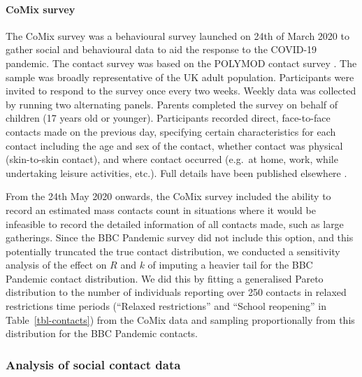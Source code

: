 \documentclass[
  10pt,
  letterpaper,
]{article}
\begin{document}
\paragraph{CoMix survey}\label{comix-survey}

The CoMix survey was a behavioural survey launched on 24th of March 2020
to gather social and behavioural data to aid the response to the
COVID-19 pandemic. The contact survey was based on the POLYMOD contact
survey \citep{mossong2008}. The sample was broadly representative of the
UK adult population. Participants were invited to respond to the survey
once every two weeks. Weekly data was collected by running two
alternating panels. Parents completed the survey on behalf of children
(17 years old or younger). Participants recorded direct, face-to-face
contacts made on the previous day, specifying certain characteristics
for each contact including the age and sex of the contact, whether
contact was physical (skin-to-skin contact), and where contact occurred
(e.g.~at home, work, while undertaking leisure activities, etc.). Full
details have been published elsewhere \citep{gimma2022}.

From the 24th May 2020 onwards, the CoMix survey included the ability to
record an estimated mass contacts count in situations where it would be
infeasible to record the detailed information of all contacts made, such
as large gatherings. Since the BBC Pandemic survey did not include this
option, and this potentially truncated the true contact distribution, we
conducted a sensitivity analysis of the effect on \(R\) and \(k\) of
imputing a heavier tail for the BBC Pandemic contact distribution. We
did this by fitting a generalised Pareto distribution to the number of
individuals reporting over 250 contacts in relaxed restrictions time
periods (``Relaxed restrictions'' and ``School reopening'' in
Table~\ref{tbl-contacts}) from the CoMix data and sampling
proportionally from this distribution for the BBC Pandemic contacts.

\subsubsection{Analysis of social contact
data}\label{analysis-of-social-contact-data}
\end{document}
